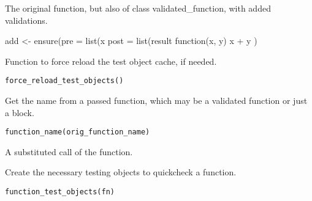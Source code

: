 \documentclass[a4paper]{book}
\begin{document}
%
\begin{Value}
The original function, but also of class validated\_function, with added validations.
\end{Value}
%
\begin{Examples}
\begin{ExampleCode}
  add <- ensure(pre = list(x %
    post = list(result %
    function(x, y) { x + y })
\end{ExampleCode}
\end{Examples}
%
\begin{Description}\relax
Function to force reload the test object cache, if needed.
\end{Description}
%
\begin{Usage}
\begin{verbatim}
force_reload_test_objects()
\end{verbatim}
\end{Usage}
%
\begin{Description}\relax
Get the name from a passed function, which may be a validated function or just a block.
\end{Description}
%
\begin{Usage}
\begin{verbatim}
function_name(orig_function_name)
\end{verbatim}
\end{Usage}
%
\begin{Arguments}
\begin{ldescription}
\item[\code{orig\_function\_name.}] A substituted call of the function.
\end{ldescription}
\end{Arguments}
%
\begin{Description}\relax
Create the necessary testing objects to quickcheck a function.
\end{Description}
%
\begin{Usage}
\begin{verbatim}
function_test_objects(fn)
\end{verbatim}
\end{Usage}
\end{document}

